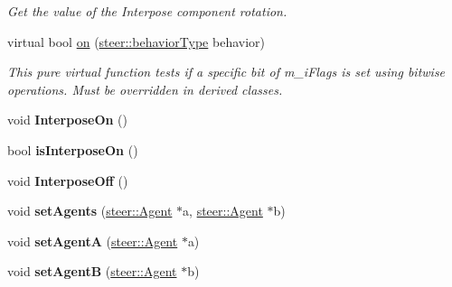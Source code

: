 \begin{DoxyCompactItemize}
\begin{DoxyCompactList}\small\item\em Get the value of the Interpose component rotation. \end{DoxyCompactList}\item 
virtual bool \hyperlink{classsteer_1_1_interpose_component_a0ad5f9af346843c67983d103d1e3d167}{on} (\hyperlink{namespacesteer_afe6e72f8f8088962727051501181acbe}{steer\-::behavior\-Type} behavior)
\begin{DoxyCompactList}\small\item\em This pure virtual function tests if a specific bit of m\-\_\-i\-Flags is set using bitwise operations. Must be overridden in derived classes. \end{DoxyCompactList}\item 
\hypertarget{classsteer_1_1_interpose_component_a8309a2d1d2dcae45a68d13bafb01b740}{void {\bfseries Interpose\-On} ()}\label{classsteer_1_1_interpose_component_a8309a2d1d2dcae45a68d13bafb01b740}

\item 
\hypertarget{classsteer_1_1_interpose_component_a996410c4ea8186310f5602c85f8787e8}{bool {\bfseries is\-Interpose\-On} ()}\label{classsteer_1_1_interpose_component_a996410c4ea8186310f5602c85f8787e8}

\item 
\hypertarget{classsteer_1_1_interpose_component_ad4e03f37825873f7127475dba89e0439}{void {\bfseries Interpose\-Off} ()}\label{classsteer_1_1_interpose_component_ad4e03f37825873f7127475dba89e0439}

\item 
\hypertarget{classsteer_1_1_interpose_component_a689155e2355f2e3159b8bd6f5346c491}{void {\bfseries set\-Agents} (\hyperlink{classsteer_1_1_agent}{steer\-::\-Agent} $\ast$a, \hyperlink{classsteer_1_1_agent}{steer\-::\-Agent} $\ast$b)}\label{classsteer_1_1_interpose_component_a689155e2355f2e3159b8bd6f5346c491}

\item 
\hypertarget{classsteer_1_1_interpose_component_ab30a6827567147106a3c5d148f88e24e}{void {\bfseries set\-Agent\-A} (\hyperlink{classsteer_1_1_agent}{steer\-::\-Agent} $\ast$a)}\label{classsteer_1_1_interpose_component_ab30a6827567147106a3c5d148f88e24e}

\item 
\hypertarget{classsteer_1_1_interpose_component_ad4481935cbdfbbac48855833b2aa25db}{void {\bfseries set\-Agent\-B} (\hyperlink{classsteer_1_1_agent}{steer\-::\-Agent} $\ast$b)}\label{classsteer_1_1_interpose_component_ad4481935cbdfbbac48855833b2aa25db}


\end{DoxyCompactItemize}

